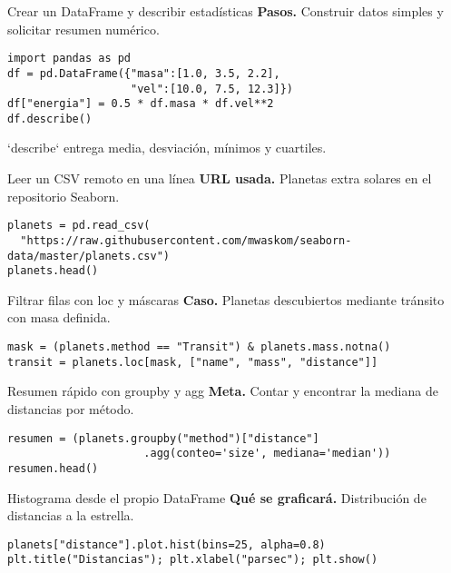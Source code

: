 \documentclass[10pt]{beamer}
\begin{document}
\begin{frame}[fragile]{Crear un DataFrame y describir estadísticas}
\textbf{Pasos.} Construir datos simples y solicitar resumen numérico.
\begin{verbatim}
import pandas as pd
df = pd.DataFrame({"masa":[1.0, 3.5, 2.2],
                   "vel":[10.0, 7.5, 12.3]})
df["energia"] = 0.5 * df.masa * df.vel**2
df.describe()
\end{verbatim}
`describe` entrega media, desviación, mínimos y cuartiles.
\end{frame}

\begin{frame}[fragile]{Leer un CSV remoto en una línea}
\textbf{URL usada.} Planetas extra solares en el repositorio Seaborn.
\begin{verbatim}
planets = pd.read_csv(
  "https://raw.githubusercontent.com/mwaskom/seaborn-data/master/planets.csv")
planets.head()
\end{verbatim}
\end{frame}

\begin{frame}[fragile]{Filtrar filas con loc y máscaras}
\textbf{Caso.} Planetas descubiertos mediante tránsito con masa definida.
\begin{verbatim}
mask = (planets.method == "Transit") & planets.mass.notna()
transit = planets.loc[mask, ["name", "mass", "distance"]]
\end{verbatim}
\end{frame}

\begin{frame}[fragile]{Resumen rápido con groupby y agg}
\textbf{Meta.} Contar y encontrar la mediana de distancias por método.
\begin{verbatim}
resumen = (planets.groupby("method")["distance"]
                     .agg(conteo='size', mediana='median'))
resumen.head()
\end{verbatim}
\end{frame}

\begin{frame}[fragile]{Histograma desde el propio DataFrame}
\textbf{Qué se graficará.} Distribución de distancias a la estrella.
\begin{verbatim}
planets["distance"].plot.hist(bins=25, alpha=0.8)
plt.title("Distancias"); plt.xlabel("parsec"); plt.show()
\end{verbatim}
\end{frame}
\end{document}
